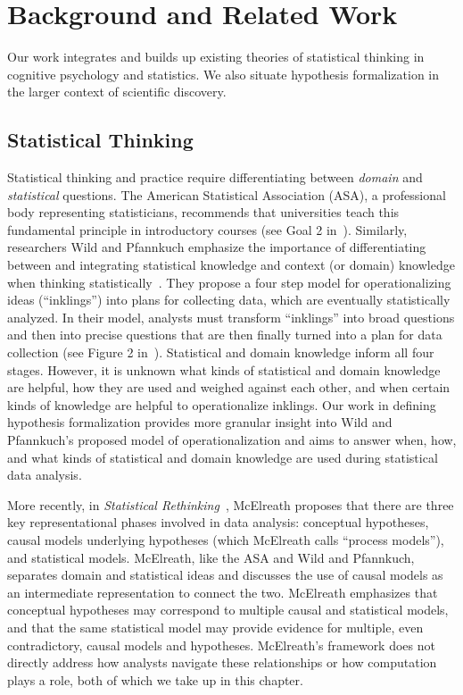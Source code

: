 \section{Background and Related Work}
Our work integrates and builds up existing theories of statistical thinking in
cognitive psychology and statistics. We also situate hypothesis formalization in
the larger context of scientific discovery. 

\subsection{Statistical Thinking} 
Statistical thinking and practice require differentiating between
\textit{domain} and \textit{statistical} questions. The American Statistical
Association (ASA), a professional body representing statisticians, recommends
that universities teach this fundamental principle in introductory courses (see
Goal 2 in~\cite{carver2016guidelines}). Similarly, researchers Wild and Pfannkuch emphasize the importance of
differentiating between and integrating statistical knowledge and context (or
domain) knowledge when thinking
statistically~\cite{pfannkuch1997statistical,pfannkuch2000statistical,wild1999statisticalThinking}.
They propose a four step model for operationalizing ideas (``inklings'') into
plans for collecting data, which are eventually statistically analyzed. In their
model, analysts must transform ``inklings'' into broad questions and then into
precise questions that are then finally turned into a plan for data collection
(see Figure 2 in~\cite{wild1999statisticalThinking}). Statistical and domain
knowledge inform all four stages. However, it is unknown what kinds of statistical and domain
knowledge are helpful, how they are used and weighed against each other, and
when certain kinds of knowledge are helpful to operationalize inklings. Our
work in defining hypothesis formalization provides more granular insight into Wild and Pfannkuch's
proposed model of operationalization and aims to answer when, how, and what
kinds of statistical and domain knowledge are used during statistical data
analysis. 

More recently, in \textit{Statistical
Rethinking}~\cite{mcelreath2020statistical}, McElreath proposes that
there are three key representational phases involved in data analysis:
conceptual hypotheses, causal models underlying hypotheses (which McElreath
calls ``process models''), and statistical models. McElreath, like the ASA and
Wild and Pfannkuch, separates domain and statistical ideas and discusses the use
of causal models as an intermediate representation to connect
the two. McElreath emphasizes that conceptual hypotheses may correspond to
multiple causal and statistical models, and that the same statistical
model may provide evidence for multiple, even contradictory, causal models and
hypotheses. McElreath's framework does not directly address how analysts navigate
these relationships or how computation plays a role, both of which we take up in
this chapter. 

